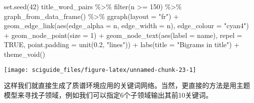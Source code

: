 \documentclass[]{tufte-book}
\newenvironment{Shaded}{}{}
\newcommand{\AttributeTok}[1]{\textcolor[rgb]{0.49,0.56,0.16}{#1}}
\newcommand{\ConstantTok}[1]{\textcolor[rgb]{0.53,0.00,0.00}{#1}}
\newcommand{\DecValTok}[1]{\textcolor[rgb]{0.25,0.63,0.44}{#1}}
\newcommand{\FloatTok}[1]{\textcolor[rgb]{0.25,0.63,0.44}{#1}}
\newcommand{\FunctionTok}[1]{\textcolor[rgb]{0.02,0.16,0.49}{#1}}
\newcommand{\NormalTok}[1]{#1}
\newcommand{\SpecialCharTok}[1]{\textcolor[rgb]{0.25,0.44,0.63}{#1}}
\newcommand{\StringTok}[1]{\textcolor[rgb]{0.25,0.44,0.63}{#1}}
\begin{document}
\begin{Shaded}
\begin{Highlighting}[]
\FunctionTok{set.seed}\NormalTok{(}\DecValTok{42}\NormalTok{)}
\NormalTok{title\_word\_pairs }\SpecialCharTok{\%\textgreater{}\%}
  \FunctionTok{filter}\NormalTok{(n }\SpecialCharTok{\textgreater{}=} \DecValTok{150}\NormalTok{) }\SpecialCharTok{\%\textgreater{}\%}
  \FunctionTok{graph\_from\_data\_frame}\NormalTok{() }\SpecialCharTok{\%\textgreater{}\%}
  \FunctionTok{ggraph}\NormalTok{(}\AttributeTok{layout =} \StringTok{"fr"}\NormalTok{) }\SpecialCharTok{+}
  \FunctionTok{geom\_edge\_link}\NormalTok{(}\FunctionTok{aes}\NormalTok{(}\AttributeTok{edge\_alpha =}\NormalTok{ n, }\AttributeTok{edge\_width =}\NormalTok{ n), }\AttributeTok{edge\_colour =} \StringTok{"cyan4"}\NormalTok{) }\SpecialCharTok{+}
  \FunctionTok{geom\_node\_point}\NormalTok{(}\AttributeTok{size =} \DecValTok{1}\NormalTok{) }\SpecialCharTok{+}
  \FunctionTok{geom\_node\_text}\NormalTok{(}\FunctionTok{aes}\NormalTok{(}\AttributeTok{label =}\NormalTok{ name), }\AttributeTok{repel =} \ConstantTok{TRUE}\NormalTok{, }
                 \AttributeTok{point.padding =} \FunctionTok{unit}\NormalTok{(}\FloatTok{0.2}\NormalTok{, }\StringTok{"lines"}\NormalTok{)) }\SpecialCharTok{+}
  \FunctionTok{labs}\NormalTok{(}\AttributeTok{title =} \StringTok{"Bigrams in title"}\NormalTok{) }\SpecialCharTok{+}
  \FunctionTok{theme\_void}\NormalTok{()}
\end{Highlighting}
\end{Shaded}

\texttt{[image: sciguide\_files/figure-latex/unnamed-chunk-23-1]}

这样我们就直接生成了质谱环境应用的关键词网络。当然，更直接的方法是用主题模型来寻找子领域，例如我们可以指定6个子领域输出其前10关键词。
\end{document}
